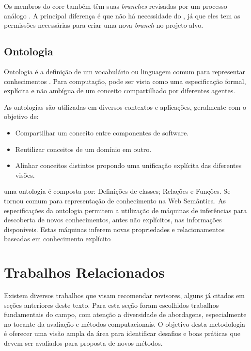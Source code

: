 \documentclass[a4paper,12pt]{monografia}
\theoremstyle{plain}
\theoremstyle{definition}
\theoremstyle{remark}
\begin{document}
  Os membros do core também têm suas \textit{branches} revisadas por um processo análogo \cite{6385140,Bosu2014}. A principal diferença é que não há necessidade do , já que eles tem as permissões necessárias para criar uma nova \textit{branch} no projeto-alvo.

\section{Ontologia}

Ontologia é a definição de um vocabulário ou linguagem comum para representar conhecimentos \cite{gruber1995}. Para computação, pode ser vista como uma especificação formal, explícita e não ambígua de um conceito compartilhado por diferentes agentes.

As ontologias são utilizadas em diversos contextos e aplicações, geralmente com o objetivo de:

\begin{itemize}
  \item Compartilhar um conceito entre componentes de software.
  \item Reutilizar conceitos de um domínio em outro.
  \item Alinhar conceitos distintos propondo uma unificação explícita das diferentes visões.
\end{itemize}

uma ontologia é composta por: Definições de classes; Relações e Funções. Se tornou comum para representação de conhecimento na Web Semântica. As especificações da ontologia permitem a utilização de máquinas de inferências para descoberta de novos conhecimentos, antes não explícitos, nas informações disponíveis. Estas máquinas inferem novas propriedades e relacionamentos baseadas em conhecimento explícito \cite{berners2001}

\chapter{Trabalhos Relacionados}\label{cha:relacionados}

Existem diversos trabalhos que visam recomendar revisores, alguns já citados em seções anteriores deste texto. Para esta seção foram escolhidos trabalhos fundamentais do campo, com atenção a diversidade de abordagens, especialmente no tocante da avaliação e métodos computacionais. O objetivo desta metodologia é oferecer uma visão ampla da área para identificar desafios e boas práticas que devem ser avaliados para proposta de novos métodos.
\end{document}

